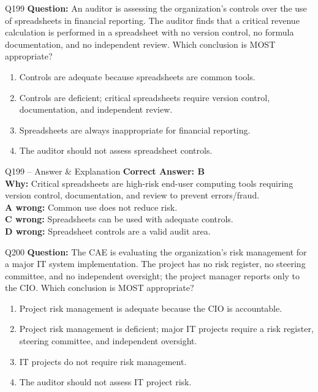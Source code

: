 \documentclass[aspectratio=169,10pt]{beamer}
\begin{document}
	\begin{frame}[t]{Q199}
		\small
		\textbf{Question:} An auditor is assessing the organization's controls over the use of spreadsheets in financial reporting. The auditor finds that a critical revenue calculation is performed in a spreadsheet with no version control, no formula documentation, and no independent review. Which conclusion is MOST appropriate?
		\begin{enumerate}[label=\Alph*.,itemsep=1pt,topsep=2pt]
			\item Controls are adequate because spreadsheets are common tools.
			\item Controls are deficient; critical spreadsheets require version control, documentation, and independent review.
			\item Spreadsheets are always inappropriate for financial reporting.
			\item The auditor should not assess spreadsheet controls.
		\end{enumerate}
	\end{frame}
	
	\begin{frame}[t]{Q199 -- Answer \& Explanation}
		\small
		\textbf{Correct Answer: B} \\[4pt]
		\textbf{Why:} Critical spreadsheets are high-risk end-user computing tools requiring version control, documentation, and review to prevent errors/fraud. \\[4pt]
		\textbf{A wrong:} Common use does not reduce risk. \\[2pt]
		\textbf{C wrong:} Spreadsheets can be used with adequate controls. \\[2pt]
		\textbf{D wrong:} Spreadsheet controls are a valid audit area.
	\end{frame}
	
	\begin{frame}[t]{Q200}
		\small
		\textbf{Question:} The CAE is evaluating the organization's risk management for a major IT system implementation. The project has no risk register, no steering committee, and no independent oversight; the project manager reports only to the CIO. Which conclusion is MOST appropriate?
		\begin{enumerate}[label=\Alph*.,itemsep=1pt,topsep=2pt]
			\item Project risk management is adequate because the CIO is accountable.
			\item Project risk management is deficient; major IT projects require a risk register, steering committee, and independent oversight.
			\item IT projects do not require risk management.
			\item The auditor should not assess IT project risk.
		\end{enumerate}
	\end{frame}
	
\end{document}
